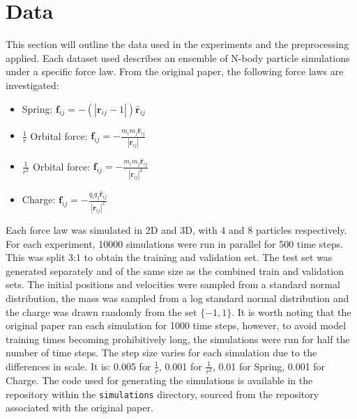 \documentclass[11pt]{article}
\begin{document}
\section{Data}
This section will outline the data used in the experiments and the preprocessing applied. Each dataset used describes an ensemble of N-body particle simulations under a specific force law. From the original paper, the following force laws are investigated:
\begin{itemize}
    \item Spring: \(\textbf{f}_{ij} = -(|\textbf{r}_{ij} - 1|) \hat{\textbf{r}}_{ij}\)
    \item \(\frac{1}{r}\) Orbital force: \(\textbf{f}_{ij} = -\frac{m_i m_j\hat{\textbf{r}}_{ij}}{|\textbf{r}_{ij}|}\)
    \item \(\frac{1}{r^2}\) Orbital force: \(\textbf{f}_{ij} = -\frac{m_i m_j \hat{\textbf{r}}_{ij}}{|\textbf{r}_{ij}|^2}\)
    \item Charge: \(\textbf{f}_{ij} = -\frac{q_i q_j \hat{\textbf{r}}_{ij}}{|\textbf{r}_{ij}|^2}\)
\end{itemize}
Each force law was simulated in 2D and 3D, with 4 and 8 particles respectively. For each experiment, 10000 simulations were run in parallel for 500 time steps. This was split 3:1 to obtain the training and validation set. The test set was generated separately and of the same size as the combined train and validation sets. The initial positions and velocities were sampled from a standard normal distribution, the mass was sampled from a log standard normal distribution and the charge was drawn randomly from the set \(\{-1, 1\}\). 
It is worth noting that the original paper ran each simulation for 1000 time steps, however, to avoid model training times becoming prohibitively long, the simulations were run for half the number of time steps. The step size varies for each simulation due to the differences in scale. It is: 0.005 for \( \frac{1}{r} \), 0.001 for \( \frac{1}{r^2} \), 0.01 for Spring, 0.001 for Charge. The code used for generating the simulations is available in the repository within the \texttt{simulations} directory, sourced from the repository associated with the original paper.
\end{document}
